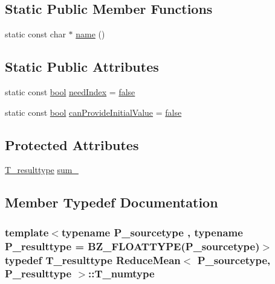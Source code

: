 \subsection*{Static Public Member Functions}
\begin{DoxyCompactItemize}
\item 
static const char $\ast$ \hyperlink{classReduceMean_a43c5f61933ee5da1abecebd7ee7b40a4}{name} ()
\end{DoxyCompactItemize}
\subsection*{Static Public Attributes}
\begin{DoxyCompactItemize}
\item 
static const \hyperlink{compiler_8h_abb452686968e48b67397da5f97445f5b}{bool} \hyperlink{classReduceMean_adafc7d37f7e62d45356634ab1453b9dd}{need\+Index} = \hyperlink{compiler_8h_a65e9886d74aaee76545e83dd09011727}{false}
\item 
static const \hyperlink{compiler_8h_abb452686968e48b67397da5f97445f5b}{bool} \hyperlink{classReduceMean_a4ee7d35ed8cc216d4b5c5b7822d601d6}{can\+Provide\+Initial\+Value} = \hyperlink{compiler_8h_a65e9886d74aaee76545e83dd09011727}{false}
\end{DoxyCompactItemize}
\subsection*{Protected Attributes}
\begin{DoxyCompactItemize}
\item 
\hyperlink{classReduceMean_a6ba4ff1f0f7d4ddf9d2b2a1ed93d7812}{T\+\_\+resulttype} \hyperlink{classReduceMean_a27a3d360fad5c0108687d90e42fa9326}{sum\+\_\+}
\end{DoxyCompactItemize}


\subsection{Member Typedef Documentation}
\hypertarget{classReduceMean_afe8ae2f9c567033aceb0824e8ee735e6}{}
\subsubsection[{T\+\_\+numtype}]{\setlength{\rightskip}{0pt plus 5cm}template$<$typename P\+\_\+sourcetype , typename P\+\_\+resulttype  = B\+Z\+\_\+\+F\+L\+O\+A\+T\+T\+Y\+P\+E(\+P\+\_\+sourcetype)$>$ typedef {\bf T\+\_\+resulttype} {\bf Reduce\+Mean}$<$ P\+\_\+sourcetype, P\+\_\+resulttype $>$\+::{\bf T\+\_\+numtype}}\label{classReduceMean_afe8ae2f9c567033aceb0824e8ee735e6}
\hypertarget{classReduceMean_a6ba4ff1f0f7d4ddf9d2b2a1ed93d7812}{}
